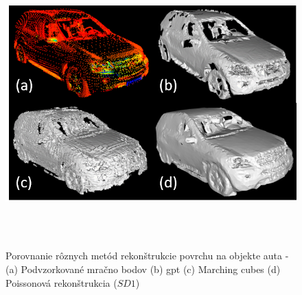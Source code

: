\begin{figure}[!htbp]
  \centering
  \includegraphics[width=16cm, height=11cm]{img/mesh_methods_compararison.png}
  \caption{Porovnanie rôznych metód rekonštrukcie povrchu na objekte auta - (a) Podvzorkované mračno bodov (b) \acrshort{gpt} (c) Marching cubes (d) Poissonová rekonštrukcia ($SD1$)} 
  \label{fig:mesh_compararison}
\end{figure} 

